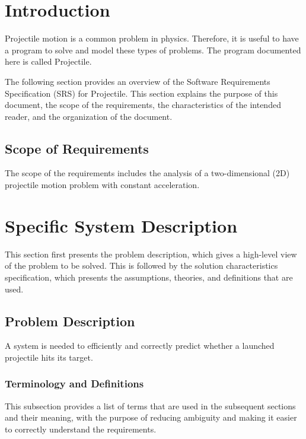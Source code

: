\documentclass[12pt]{article}
\begin{document}
\section{Introduction}
\label{Sec:Intro}
Projectile motion is a common problem in physics. Therefore, it is useful to have a program to solve and model these types of problems. The program documented here is called Projectile.

The following section provides an overview of the Software Requirements Specification (SRS) for Projectile. This section explains the purpose of this document, the scope of the requirements, the characteristics of the intended reader, and the organization of the document.

\subsection{Scope of Requirements}
\label{Sec:ReqsScope}
The scope of the requirements includes the analysis of a two-dimensional (2D) projectile motion problem with constant acceleration.

\section{Specific System Description}
\label{Sec:SpecSystDesc}
This section first presents the problem description, which gives a high-level view of the problem to be solved. This is followed by the solution characteristics specification, which presents the assumptions, theories, and definitions that are used.

\subsection{Problem Description}
\label{Sec:ProbDesc}
A system is needed to efficiently and correctly predict whether a launched projectile hits its target.

\subsubsection{Terminology and Definitions}
\label{Sec:TermDefs}
This subsection provides a list of terms that are used in the subsequent sections and their meaning, with the purpose of reducing ambiguity and making it easier to correctly understand the requirements.
\end{document}

